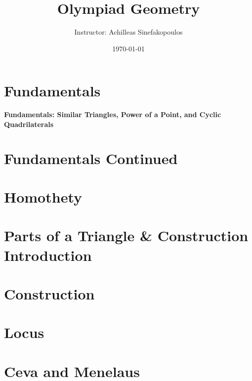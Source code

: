 \documentclass[11pt, twoside]{scrbook}
\begin{document}
\title{Olympiad Geometry}


\author{Instructor: Achilleas Sinefakopoulos}
\date{\today}

\maketitle

\setcounter{secnumdepth}{3}
\setcounter{tocdepth}{3}

\tableofcontents

\chapter{Fundamentals}
\textbf{Fundamentals: Similar Triangles, Power of a Point, and Cyclic Quadrilaterals}

	


\chapter{Fundamentals Continued}
	



\chapter{Homothety}
	



\chapter{Parts of a Triangle \& Construction Introduction}
	



\chapter{Construction}
	



\chapter{Locus}
	


\chapter{Ceva and Menelaus	}
	

\end{document}
